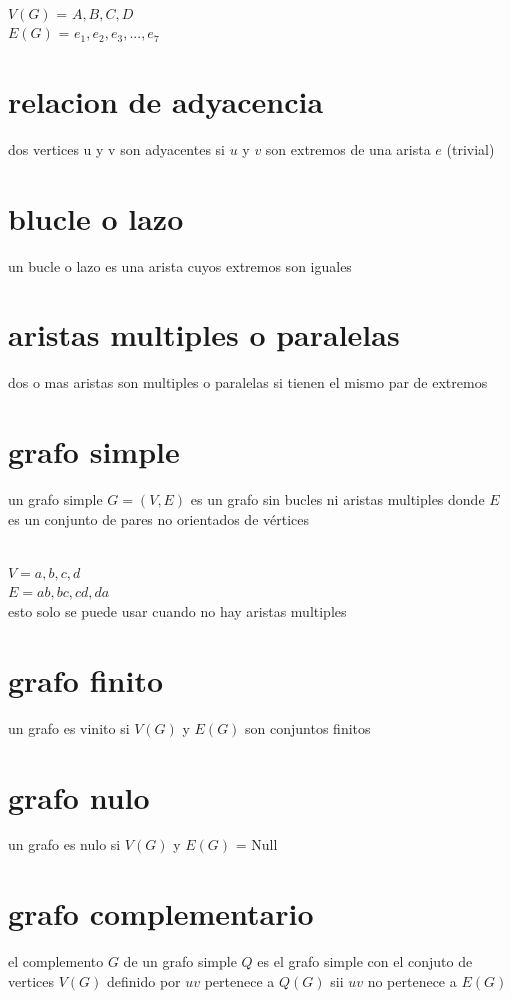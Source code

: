 \documentclass[10pt,a4paper]{article} %
\begin{document}
        \\ $ V(G)  $   = $ {A,B,C,D}  $  
        \\ $ E(G)  $  = $ e_1 , e_2 , e_3 , ... , e_7  $  
     \section{relacion de adyacencia}
         dos vertices u y v son adyacentes si $ u $ y $ v  $  son extremos de
         una arista $ e   $ (trivial) 
     \section{blucle o lazo}
         un bucle o lazo  es una arista cuyos extremos son iguales
     \section{aristas multiples o paralelas}
         dos o mas aristas son multiples o paralelas si tienen el mismo par de extremos
      \section{grafo simple}
          un grafo simple $ G = (V,E)  $  es un grafo sin bucles
          ni aristas multiples donde $ E  $  es un conjunto de
          pares no orientados de vértices
          
          \\ $ V = {a,b,c,d}  $  
          \\ $ E = {ab,bc,cd,da}  $  
          \\esto solo se puede usar cuando no hay aristas multiples
      \section{grafo finito}
          un grafo es vinito si $ V(G)  $  y $ E(G)  $  son conjuntos finitos 
      \section{grafo nulo}
          un grafo es nulo si $ V(G)  $  y $ E(G)  $   = Null
      \section{grafo complementario}
          el complemento $ G  $  de un grafo simple $ Q  $  es el grafo simple
          con el conjuto de vertices $ V(G)  $  definido por $ uv   $
          pertenece a $ Q(G)  $  sii $ uv  $  no pertenece a $ E(G)  $  
            







    
    \nocite{*}
    
    
\end{document}
